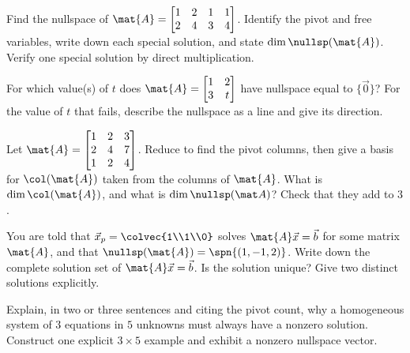 \begin{exercise}\label{ch12:ex-null}
Find the nullspace of
$\mat{A}=\begin{bmatrix}1 & 2 & 1 & 1\\2 & 4 & 3 & 4\end{bmatrix}$.
Identify the pivot and free variables, write down each special solution, and
state $\dim\nullsp(\mat{A})$. Verify one special solution by direct multiplication.
\end{exercise}

\begin{exercise}\label{ch12:ex-trivial}
For which value(s) of $t$ does $\mat{A}=\begin{bmatrix}1 & 2\\3 & t\end{bmatrix}$
have nullspace equal to $\{\vec 0\}$? For the value of $t$ that fails, describe
the nullspace as a line and give its direction.
\end{exercise}

\begin{exercise}\label{ch12:ex-colbasis}
Let $\mat{A}=\begin{bmatrix}1 & 2 & 3\\2 & 4 & 7\\1 & 2 & 4\end{bmatrix}$. Reduce
to find the pivot columns, then give a basis for $\col(\mat{A})$ taken from the
columns of $\mat{A}$. What is $\dim\col(\mat{A})$, and what is $\dim\nullsp(\mat
A)$? Check that they add to $3$.
\end{exercise}

\begin{exercise}\label{ch12:ex-complete}
You are told that $\vec{x}_p=\colvec{1\\1\\0}$ solves $\mat{A}\vec{x}=\vec{b}$ for
some matrix $\mat{A}$, and that $\nullsp(\mat{A})=\spn\{(1,-1,2)\}$. Write down the
complete solution set of $\mat{A}\vec{x}=\vec{b}$. Is the solution unique? Give
two distinct solutions explicitly.
\end{exercise}

\begin{exercise}\label{ch12:ex-wide}
Explain, in two or three sentences and citing the pivot count, why a homogeneous
system of $3$ equations in $5$ unknowns must always have a nonzero solution.
Construct one explicit $3\times5$ example and exhibit a nonzero nullspace vector.
\end{exercise}


